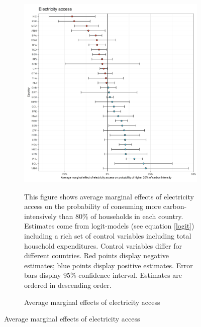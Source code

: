  \begin{figure}[ht!]\ContinuedFloat
   \centering
   \begin{subfigure}[b]{\textwidth}
   \centering
   \caption{Average marginal effects of electricity access} \label{fig:Logit_ME_electricity}
   \includegraphics{1_Figures/Analysis_Logit_Models_Marginal_Effects/Average_Marginal_Effects_affected_upper_80_electricity.access_2017.jpg}
   \begin{subcaption2}
     This figure shows average marginal effects of electricity access on the probability of consuming more carbon-intensively than 80\% of households in each country. Estimates come from logit-models (see equation \ref{logit}) including a rich set of control variables including total household expenditures. Control variables differ for different countries. Red points display negative estimates; blue points display positive estimates. Error bars display 95\%-confidence interval. Estimates are ordered in descending order.
   \end{subcaption2}
   \end{subfigure}
 \end{figure}
 \clearpage

